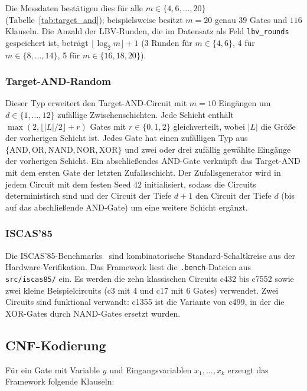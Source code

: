\documentclass[a4paper,12pt]{article}
\theoremstyle{definition}
\begin{document}
Die Messdaten bestätigen dies für alle $m \in \{4, 6, \ldots, 20\}$ (Tabelle~\ref{tab:target_and}); beispielsweise besitzt $m=20$ genau $39$ Gates und $116$ Klauseln. Die Anzahl der LBV-Runden, die im Datensatz als Feld \texttt{lbv\_rounds} gespeichert ist, beträgt $\lfloor \log_2 m \rfloor + 1$ (3 Runden für $m \in \{4,6\}$, 4 für $m \in \{8,\ldots,14\}$, 5 für $m \in \{16,18,20\}$).

\subsubsection{Target-AND-Random}

Dieser Typ erweitert den Target-AND-Circuit mit $m=10$ Eingängen um $d \in \{1, \ldots, 12\}$ zufällige Zwischenschichten. Jede Schicht enthält $\max(2, \lfloor |L|/2 \rfloor + r)$ Gates mit $r \in \{0,1,2\}$ gleichverteilt, wobei $|L|$ die Größe der vorherigen Schicht ist. Jedes Gate hat einen zufälligen Typ aus $\{\mathrm{AND}, \mathrm{OR}, \mathrm{NAND}, \mathrm{NOR}, \mathrm{XOR}\}$ und zwei oder drei zufällig gewählte Eingänge der vorherigen Schicht. Ein abschließendes AND-Gate verknüpft das Target-AND mit dem ersten Gate der letzten Zufallsschicht. Der Zufallsgenerator wird in jedem Circuit mit dem festen Seed $42$ initialisiert, sodass die Circuits deterministisch sind und der Circuit der Tiefe $d+1$ den Circuit der Tiefe $d$ (bis auf das abschließende AND-Gate) um eine weitere Schicht ergänzt.

\subsubsection{ISCAS'85}

Die ISCAS'85-Benchmarks~\cite{brglez1985} sind kombinatorische Standard-Schaltkreise aus der Hardware-Verifikation. Das Framework liest die \texttt{.bench}-Dateien aus \texttt{src/iscas85/} ein. Es werden die zehn klassischen Circuits c432 bis c7552 sowie zwei kleine Beispielcircuits (c3 mit 4 und c17 mit 6 Gates) verwendet. Zwei Circuits sind funktional verwandt: c1355 ist die Variante von c499, in der die XOR-Gates durch NAND-Gates ersetzt wurden.

\subsection{CNF-Kodierung}
\label{sec:cnf}

Für ein Gate mit Variable $y$ und Eingangsvariablen $x_1, \ldots, x_k$ erzeugt das Framework folgende Klauseln:
\end{document}
